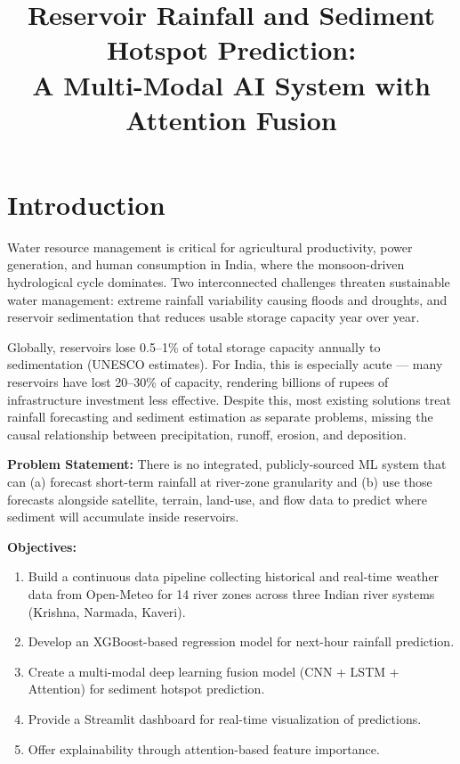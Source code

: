 \documentclass[twocolumn]{article}
\title{Reservoir Rainfall and Sediment Hotspot Prediction:\\A Multi-Modal AI System with Attention Fusion}
\author{}
\date{}
\begin{document}
\maketitle

\section{Introduction}

Water resource management is critical for agricultural productivity, power generation, and human consumption in India, where the monsoon-driven hydrological cycle dominates. Two interconnected challenges threaten sustainable water management: extreme rainfall variability causing floods and droughts, and reservoir sedimentation that reduces usable storage capacity year over year.

Globally, reservoirs lose 0.5--1\% of total storage capacity annually to sedimentation (UNESCO estimates). For India, this is especially acute --- many reservoirs have lost 20--30\% of capacity, rendering billions of rupees of infrastructure investment less effective. Despite this, most existing solutions treat rainfall forecasting and sediment estimation as separate problems, missing the causal relationship between precipitation, runoff, erosion, and deposition.

\textbf{Problem Statement:} There is no integrated, publicly-sourced ML system that can (a) forecast short-term rainfall at river-zone granularity and (b) use those forecasts alongside satellite, terrain, land-use, and flow data to predict where sediment will accumulate inside reservoirs.

\textbf{Objectives:}
\begin{enumerate}
    \item Build a continuous data pipeline collecting historical and real-time weather data from Open-Meteo for 14 river zones across three Indian river systems (Krishna, Narmada, Kaveri).
    \item Develop an XGBoost-based regression model for next-hour rainfall prediction.
    \item Create a multi-modal deep learning fusion model (CNN + LSTM + Attention) for sediment hotspot prediction.
    \item Provide a Streamlit dashboard for real-time visualization of predictions.
    \item Offer explainability through attention-based feature importance.
\end{enumerate}
\end{document}
